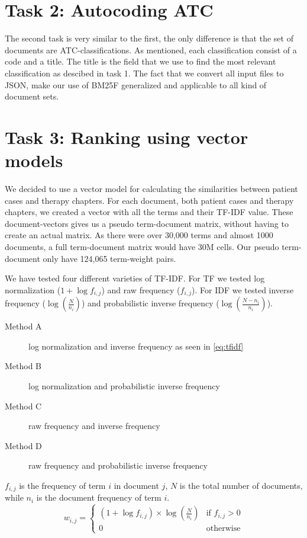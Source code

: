 \section{Task 2: Autocoding ATC}
The second task is very similar to the first, the only difference is that the set of documents are ATC-classifications. As mentioned, each classification consist of a code and a title. The title is the field that we use to find the most relevant classification as descibed in task 1. The fact that we convert all input files to JSON, make our use of BM25F generalized and applicable to all kind of document sets.

\section{Task 3: Ranking using vector models}
\label{sec:task3}
We decided to use a vector model for calculating the similarities between
patient cases and therapy chapters. For each document, both patient cases
and therapy chapters, we created a vector with all the terms and their
TF-IDF value. These document-vectors gives us a pseudo term-document matrix,
without having to create an actual matrix. As there were over 30,000 terms
and almost 1000 documents, a full term-document matrix would have 30M cells.
Our pseudo term-document only have 124,065 term-weight pairs.

We have tested four different varieties of TF-IDF. For TF we tested log
normalization (\( 1 + \log f_{i,j} \)) and raw frequency (\( f_{i,j} \)).
For IDF we tested inverse frequency (\( \log(\frac{N}{n_{i}}) \)) and
probabilistic inverse frequency (\( \log(\frac{N - n_{i}}{n_{i}}) \)).
\begin{description}
	\item[Method A] log normalization and inverse frequency as seen in \autoref{eq:tfidf}
	\item[Method B] log normalization and probabilistic inverse frequency
	\item[Method C] raw frequency and inverse frequency 
	\item[Method D] raw frequency and probabilistic inverse frequency
\end{description}
\( f_{i,j} \) is the frequency of term \( i \) in document
\( j \), \( N \) is the total number of documents, while \( n_{i} \) is the
document frequency of term \( i \).
\begin{equation} \label{eq:tfidf}
	w_{i,j} =
	\begin{cases}
		(1 + \log f_{i,j}) \times \log(\frac{N}{n_{i}}) & \text{if } f_{i,j} > 0 \\
		0												& \text{otherwise}
	\end{cases}
\end{equation}

